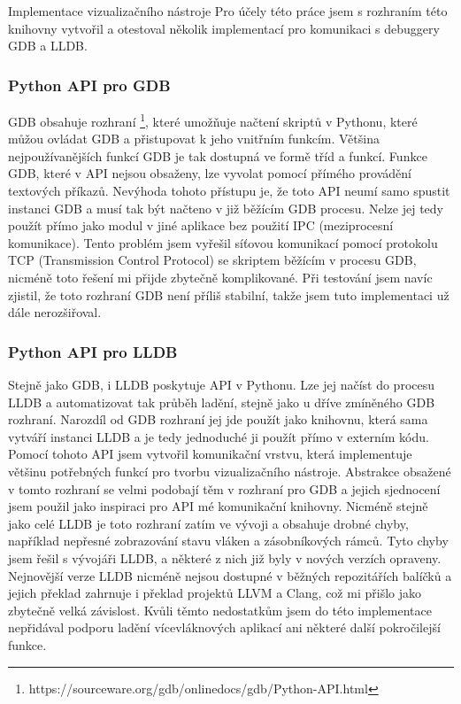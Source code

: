\documentclass[czech,bachelor,male,python,dept460,hidelinks]{diploma}						%
\begin{document}
\begin{section}{Implementace vizualizačního nástroje}
		Pro účely této práce jsem s rozhraním této knihovny vytvořil a otestoval několik implementací pro komunikaci s debuggery GDB a LLDB.

		\subsubsection{Python API pro GDB}
		\label{ref:GdbPythonApi}
		GDB obsahuje rozhraní \footnote{https://sourceware.org/gdb/onlinedocs/gdb/Python-API.html}, které umožňuje načtení skriptů v Pythonu, které
		můžou ovládat GDB a přistupovat k jeho vnitřním funkcím. Většina nejpoužívanějších funkcí GDB je tak dostupná ve formě tříd a funkcí.
		Funkce GDB, které v API nejsou obsaženy, lze vyvolat pomocí přímého provádění textových příkazů.
		Nevýhoda tohoto přístupu je, že toto API neumí samo spustit instanci GDB a musí tak být načteno v již běžícím GDB procesu.
		Nelze jej tedy použít přímo jako modul v jiné aplikace bez použití IPC (meziprocesní komunikace).
		Tento problém jsem vyřešil síťovou komunikací pomocí protokolu TCP (Transmission Control Protocol) se skriptem běžícím v procesu GDB, nicméně
		toto řešení mi přijde zbytečně komplikované. Při testování jsem navíc zjistil, že toto rozhraní GDB není příliš stabilní, takže jsem tuto implementaci
		už dále nerozšiřoval.
		
		\subsubsection{Python API pro LLDB}
		Stejně jako GDB, i LLDB poskytuje API v Pythonu. Lze jej načíst do procesu LLDB a automatizovat tak průběh ladění, stejně jako u dříve zmíněného GDB
		rozhraní. Narozdíl od GDB rozhraní jej jde použít jako knihovnu, která sama vytváří instanci LLDB a je tedy jednoduché ji použít přímo v externím kódu.
		Pomocí tohoto API jsem vytvořil komunikační vrstvu, která implementuje většinu potřebných funkcí pro tvorbu vizualizačního nástroje.
		Abstrakce obsažené v tomto rozhraní se velmi podobají těm v rozhraní pro GDB a jejich sjednocení jsem použil jako inspiraci pro API mé komunikační knihovny.
		Nicméně stejně jako celé LLDB je toto rozhraní zatím ve vývoji a obsahuje drobné chyby, například nepřesné zobrazování stavu vláken a zásobníkových rámců.
		Tyto chyby jsem řešil s vývojáři LLDB, a některé z nich již byly v nových verzích opraveny. Nejnovější verze LLDB nicméně nejsou dostupné v běžných
		repozitářích balíčků a jejich překlad zahrnuje i překlad projektů LLVM a Clang, což mi přišlo jako zbytečně velká závislost.
		Kvůli těmto nedostatkům jsem do této implementace nepřidával podporu ladění vícevláknových aplikací ani některé další pokročilejší funkce.
		

\end{section}
\end{document}
